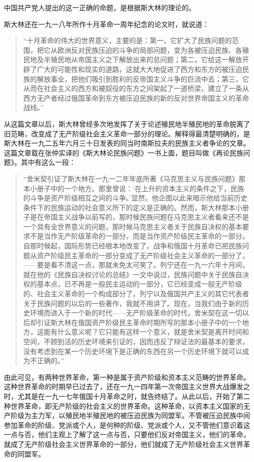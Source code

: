 中国共产党人提出的这一正确的命题，是根据斯大林的理论的。

斯大林还在一九一八年所作十月革命一周年纪念的论文时，就说道：

\begin{quote}
“十月革命的伟大的世界意义，主要的是：第一，它扩大了民族问题的范围，把它从欧洲反对民族压迫的斗争的局部问题，变为各被压迫民族、各殖民地及半殖民地从帝国主义之下解放出来的总问题；第二，它给这一解放开辟了广大的可能性和现实的道路，这就大大地促进了西方和东方的被压迫民族的解放事业，把他们吸引到胜利的反帝国主义斗争的巨流中去；第三，它从而在社会主义的西方和被奴役的东方之间架起了一道桥梁，建立了一条从西方无产者经过俄国革命到东方被压迫民族的新的反对世界帝国主义的革命战线。”
\end{quote}

从这篇文章以后，斯大林曾经多次地发挥了关于论述殖民地半殖民地的革命脱离了旧范畴，改变成了无产阶级社会主义革命一部分的理论。解释得最清楚明确的，是斯大林在一九二五年六月三十日发表的同当时南斯拉夫的民族主义者争论的文章。这篇文章载在张仲实译的《斯大林论民族问题》一书上面，题目叫做《再论民族问题》。其中有这么一段：

\begin{quote}
“舍米契引证了斯大林在一九一二年年底所著《马克思主义与民族问题》那本小册子中的一个地方。那里曾说：‘在上升的资本主义的条件之下，民族的斗争是资产阶级相互之间的斗争。’显然，他企图以此来暗示他给当前历史条件下的民族运动的社会意义所下的定义是正确的。然而，斯大林那本小册子是在帝国主义战争以前写的，那时候民族问题在马克思主义者看来还不是一个具有全世界意义的问题，那时候马克思主义者关于民族自决权的基本要求不是当作无产阶级革命的一部分，而是当作资产阶级民主革命的一部分。自那时候起，国际形势已经根本地改变了，战争和俄国十月革命已把民族问题从资产阶级民主革命的一部分变成了无产阶级社会主义革命的一部分了，——要是看不清这一点，那就未免太可笑了。列宁还在一九一六年十月间，就在他的《民族自决权讨论的总结》一文中说过，民族问题中关于民族自决权的基本点，已不再是一般民主运动的一部分，它已经变成一般无产阶级的、社会主义革命的一个构成部分了。列宁以及俄国共产主义的其它代表者关于民族问题的以后的一些著作，我就不用讲了。现在，当我们由于新的历史环境而进入于一个新的时代——无产阶级革命的时代，舍米契在这一切以后却引证斯大林在俄国资产阶级民主革命时期所写的那本小册子中的一个地方，这能有什么意义呢？它只能有这样一个意义，就是舍米契是离开时间和空间，不顾到活的历史环境来引证的，因而违反了辩证法的最基本的要求，没有考虑到在某一个历史环境下是正确的东西在另一个历史环境下就可以成为不正确的。”
\end{quote}

由此可见，有两种世界革命，第一种是属于资产阶级和资本主义范畴的世界革命。这种世界革命的时期早已过去了，还在一九一四年第一次帝国主义世界大战爆发之时，尤其是在一九一七年俄国十月革命之时，就告终结了。从此以后，开始了第二种世界革命，即无产阶级的社会主义的世界革命。这种革命，以资本主义国家的无产阶级为主力军，以殖民地半殖民地的被压迫民族为同盟军。不管被压迫民族中间参加革命的阶级、党派或个人，是何种的阶级、党派或个人，又不管他们意识着这一点与否，他们主观上了解了这一点与否，只要他们反对帝国主义，他们的革命，就成了无产阶级社会主义世界革命的一部分，他们就成了无产阶级社会主义世界革命的同盟军。

